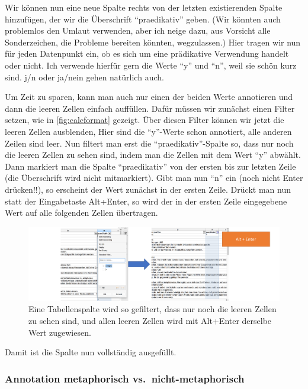 \documentclass[]{article}
\begin{document}
Wir können nun eine neue Spalte rechts von der letzten existierenden
Spalte hinzufügen, der wir die Überschrift ``praedikativ'' geben. (Wir
könnten auch problemlos den Umlaut verwenden, aber ich neige dazu, aus
Vorsicht alle Sonderzeichen, die Probleme bereiten könnten,
wegzulassen.) Hier tragen wir nun für jeden Datenpunkt ein, ob es sich
um eine prädikative Verwendung handelt oder nicht. Ich verwende hierfür
gern die Werte ``y'' und ``n'', weil sie schön kurz sind. j/n oder
ja/nein gehen natürlich auch.

Um Zeit zu sparen, kann man auch nur einen der beiden Werte annotieren
und dann die leeren Zellen einfach auffüllen. Dafür müssen wir zunächst
einen Filter setzen, wie in \ref{fig:calcformat} gezeigt. Über diesen
Filter können wir jetzt die leeren Zellen ausblenden, Hier sind die
``y''-Werte schon annotiert, alle anderen Zeilen sind leer. Nun filtert
man erst die ``praedikativ''-Spalte so, dass nur noch die leeren Zellen
zu sehen sind, indem man die Zellen mit dem Wert ``y'' abwählt. Dann
markiert man die Spalte ``praedikativ'' von der ersten bis zur letzten
Zeile (die Überschrift wird nicht mitmarkiert). Gibt man nun ``n'' ein
(noch nicht Enter drücken!!), so erscheint der Wert zunächst in der
ersten Zeile. Drückt man nun statt der Eingabetaste Alt+Enter, so wird
der in der ersten Zeile eingegebene Wert auf alle folgenden Zellen
übertragen.

\begin{figure}
\includegraphics[width=6.66in]{docs/fig/calc_bulkchange} \caption{Eine Tabellenspalte wird so gefiltert, dass nur noch die leeren Zellen zu sehen sind, und allen leeren Zellen wird mit Alt+Enter derselbe Wert zugewiesen.}\label{fig:calcbulkchange}
\end{figure}

Damit ist die Spalte nun vollständig ausgefüllt.

\subsubsection{Annotation metaphorisch
vs.~nicht-metaphorisch}\label{annotation-metaphorisch-vs.nicht-metaphorisch}
\end{document}
